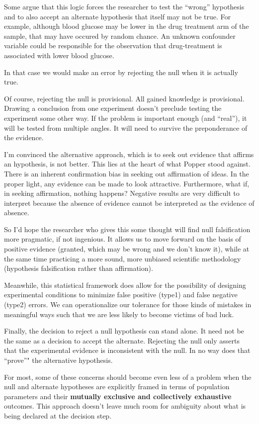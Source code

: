\documentclass[]{book}
\begin{document}
Some argue that this logic forces the researcher to test the ``wrong'' hypothesis and to also accept an alternate hypothesis that itself may not be true. For example, although blood glucose may be lower in the drug treatment arm of the sample, that may have occured by random chance. An unknown confounder variable could be responsible for the observation that drug-treatment is associated with lower blood glucose.

In that case we would make an error by rejecting the null when it is actually true.

Of course, rejecting the null is provisional. All gained knowledge is provisional. Drawing a conclusion from one experiment doesn't preclude testing the experiment some other way. If the problem is important enough (and ``real''), it will be tested from multiple angles. It will need to survive the preponderance of the evidence.

I'm convinced the alternative approach, which is to seek out evidence that affirms an hypothesis, is not better. This lies at the heart of what Popper stood against. There is an inherent confirmation bias in seeking out affirmation of ideas. In the proper light, any evidence can be made to look attractive. Furthermore, what if, in seeking affirmation, nothing happens? Negative results are very difficult to interpret because the absence of evidence cannot be interpreted as the evidence of absence.

So I'd hope the researcher who gives this some thought will find null falsification more pragmatic, if not ingenious. It allows us to move forward on the basis of positive evidence (granted, which may be wrong and we don't know it), while at the same time practicing a more sound, more unbiased scientific methodology (hypothesis falsification rather than affirmation).

Meanwhile, this statistical framework does allow for the possibility of designing experimental conditions to minimize false positive (type1) and false negative (type2) errors. We can operationalize our tolerance for those kinds of mistakes in meaningful ways such that we are less likely to become victims of bad luck.

Finally, the decision to reject a null hypothesis can stand alone. It need not be the same as a decision to accept the alternate. Rejecting the null only asserts that the experimental evidence is inconsistent with the null. In no way does that ``prove''" the alternative hypothesis.

For most, some of these concerns should become even less of a problem when the null and alternate hypotheses are explicitly framed in terms of population parameters and their \textbf{mutually exclusive and collectively exhaustive} outcomes. This approach doesn't leave much room for ambiguity about what is being declared at the decision step.
\end{document}
